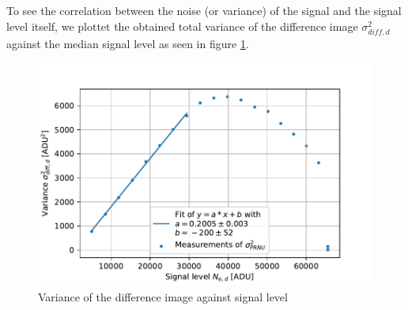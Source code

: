 \documentclass[12pt]{article}
\begin{document}
To see the correlation between the noise (or variance) of the signal and the signal level itself, we plottet the obtained total variance of the difference image $\sigma_{diff,d}^2$ against the median signal level as seen in figure \ref{fig: sensitivity}.
\begin{figure}[h]
\centering
\includegraphics[width=1\textwidth]{figures/sensitivity_plot.pdf} 
\caption{Variance of the difference image against signal level}
\label{fig: sensitivity}
\end{figure}
\end{document}
